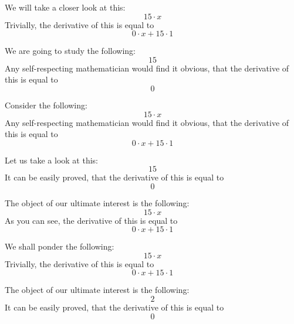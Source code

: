 \documentclass{article}
\begin{document}
We will take a closer look at this:
\begin{equation}
15 \cdot x 
\end{equation}
Trivially, the derivative of this is equal to
\begin{equation}
0 \cdot x + 15 \cdot 1 
\end{equation}

We are going to study the following:
\begin{equation}
15 
\end{equation}
Any self-respecting mathematician would find it obvious, that the derivative of this is equal to
\begin{equation}
0 
\end{equation}

Consider the following:
\begin{equation}
15 \cdot x 
\end{equation}
Any self-respecting mathematician would find it obvious, that the derivative of this is equal to
\begin{equation}
0 \cdot x + 15 \cdot 1 
\end{equation}

Let us take a look at this:
\begin{equation}
15 
\end{equation}
It can be easily proved, that the derivative of this is equal to
\begin{equation}
0 
\end{equation}

The object of our ultimate interest is the following:
\begin{equation}
15 \cdot x 
\end{equation}
As you can see, the derivative of this is equal to
\begin{equation}
0 \cdot x + 15 \cdot 1 
\end{equation}

We shall ponder the following:
\begin{equation}
15 \cdot x 
\end{equation}
Trivially, the derivative of this is equal to
\begin{equation}
0 \cdot x + 15 \cdot 1 
\end{equation}

The object of our ultimate interest is the following:
\begin{equation}
2 
\end{equation}
It can be easily proved, that the derivative of this is equal to
\begin{equation}
0 
\end{equation}
\end{document}
